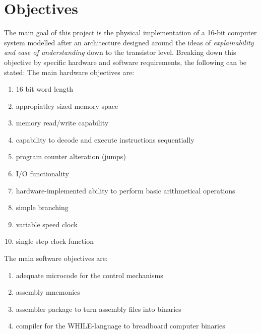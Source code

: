 \documentclass[11pt]{informatics-report}
\begin{document}
\section{Objectives}
The main goal of this project is the physical implementation of a 16-bit computer system modelled after an architecture designed around the ideas of \emph{explainability and ease of understanding} down to the transistor level. Breaking down this objective by specific hardware and software requirements, the following can be stated:
The main hardware  objectives are:
\begin{enumerate}
  \item 16 bit word length
  \item appropiatley sized memory space
  \item memory read/write capability
  \item capability to decode and execute instructions sequentially
  \item program counter alteration (jumps)
  \item I/O functionality
  \item hardware-implemented ability to perform basic arithmetical operations
  \item simple branching
  \item variable speed clock
  \item single step clock function
\end{enumerate}\pagebreak
The main software objectives are:
\begin{enumerate}
  \item adequate microcode for the control mechanisms
  \item assembly mnemonics
  \item assembler package to turn assembly files into binaries
  \item compiler for the WHILE-language to breadboard computer binaries
\end{enumerate}
\end{document}
